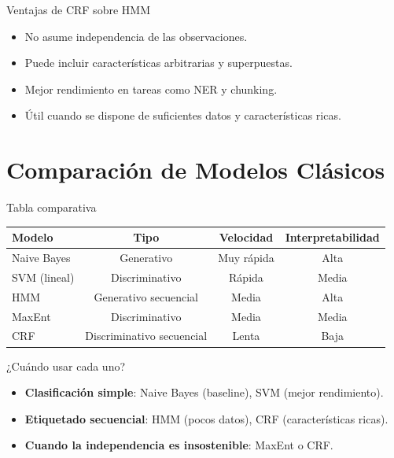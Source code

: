 \documentclass[aspectratio=169, 10pt, xcolor=table]{beamer}
\begin{document}
\begin{frame}{Ventajas de CRF sobre HMM}
    \begin{itemize}
        \item No asume independencia de las observaciones.
        \item Puede incluir características arbitrarias y superpuestas.
        \item Mejor rendimiento en tareas como NER y chunking.
        \item Útil cuando se dispone de suficientes datos y características ricas.
    \end{itemize}
\end{frame}

\section{Comparación de Modelos Clásicos}

\begin{frame}{Tabla comparativa}
    \begin{table}
        \centering
        \begin{tabular}{l|c|c|c}
            \toprule
            \textbf{Modelo} & \textbf{Tipo} & \textbf{Velocidad} & \textbf{Interpretabilidad} \\
            \midrule
            Naive Bayes & Generativo & Muy rápida & Alta \\
            SVM (lineal) & Discriminativo & Rápida & Media \\
            HMM & Generativo secuencial & Media & Alta \\
            MaxEnt & Discriminativo & Media & Media \\
            CRF & Discriminativo secuencial & Lenta & Baja \\
            \bottomrule
        \end{tabular}
    \end{table}
\end{frame}

\begin{frame}{¿Cuándo usar cada uno?}
    \begin{itemize}
        \item \textbf{Clasificación simple}: Naive Bayes (baseline), SVM (mejor rendimiento).
        \item \textbf{Etiquetado secuencial}: HMM (pocos datos), CRF (características ricas).
        \item \textbf{Cuando la independencia es insostenible}: MaxEnt o CRF.
    \end{itemize}
\end{frame}
\end{document}
